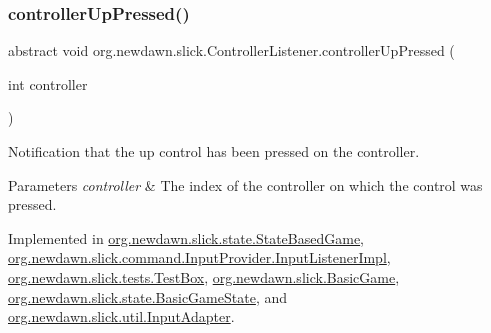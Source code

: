 \mbox{\label{interfaceorg_1_1newdawn_1_1slick_1_1_controller_listener_a7cb917761de1e555b23469042b6f1e03}} 
\subsubsection{\texorpdfstring{controller\+Up\+Pressed()}{controllerUpPressed()}}
{\footnotesize\ttfamily abstract void org.\+newdawn.\+slick.\+Controller\+Listener.\+controller\+Up\+Pressed (\begin{DoxyParamCaption}\item[{int}]{controller }\end{DoxyParamCaption})\hspace{0.3cm}{\ttfamily [abstract]}}

Notification that the up control has been pressed on the controller.


\begin{DoxyParams}{Parameters}
{\em controller} & The index of the controller on which the control was pressed. \\
\hline
\end{DoxyParams}


Implemented in \mbox{\hyperlink{classorg_1_1newdawn_1_1slick_1_1state_1_1_state_based_game_aca15c428e95858fe7d3061948f581e22}{org.\+newdawn.\+slick.\+state.\+State\+Based\+Game}}, \mbox{\hyperlink{classorg_1_1newdawn_1_1slick_1_1command_1_1_input_provider_1_1_input_listener_impl_a6e6f72ea130bc39ce0d96db6d4f80d8c}{org.\+newdawn.\+slick.\+command.\+Input\+Provider.\+Input\+Listener\+Impl}}, \mbox{\hyperlink{classorg_1_1newdawn_1_1slick_1_1tests_1_1_test_box_a3d43a20b538fd2f3331742cd26466274}{org.\+newdawn.\+slick.\+tests.\+Test\+Box}}, \mbox{\hyperlink{classorg_1_1newdawn_1_1slick_1_1_basic_game_a56128159ddf4514b79fe5fda77d4e97b}{org.\+newdawn.\+slick.\+Basic\+Game}}, \mbox{\hyperlink{classorg_1_1newdawn_1_1slick_1_1state_1_1_basic_game_state_a14126c2898a6d16c31255e09dbc31df8}{org.\+newdawn.\+slick.\+state.\+Basic\+Game\+State}}, and \mbox{\hyperlink{classorg_1_1newdawn_1_1slick_1_1util_1_1_input_adapter_ae4728619a49e096201282b048c6b11df}{org.\+newdawn.\+slick.\+util.\+Input\+Adapter}}.

